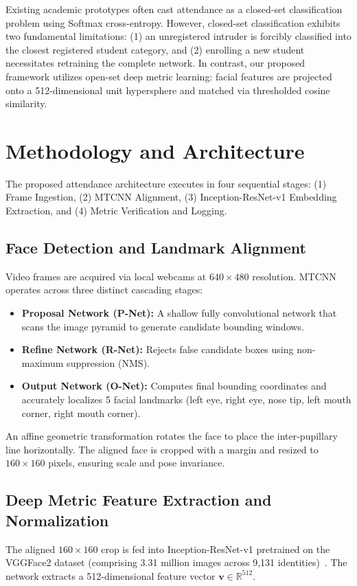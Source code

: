 \documentclass[conference]{IEEEtran}
\begin{document}
Existing academic prototypes often cast attendance as a closed-set classification problem using Softmax cross-entropy. However, closed-set classification exhibits two fundamental limitations: (1) an unregistered intruder is forcibly classified into the closest registered student category, and (2) enrolling a new student necessitates retraining the complete network. In contrast, our proposed framework utilizes open-set deep metric learning: facial features are projected onto a 512-dimensional unit hypersphere and matched via thresholded cosine similarity.

\section{Methodology and Architecture}
The proposed attendance architecture executes in four sequential stages: (1) Frame Ingestion, (2) MTCNN Alignment, (3) Inception-ResNet-v1 Embedding Extraction, and (4) Metric Verification and Logging.

\subsection{Face Detection and Landmark Alignment}
Video frames are acquired via local webcams at $640\times 480$ resolution. MTCNN operates across three distinct cascading stages:
\begin{itemize}
    \item \textbf{Proposal Network (P-Net):} A shallow fully convolutional network that scans the image pyramid to generate candidate bounding windows.
    \item \textbf{Refine Network (R-Net):} Rejects false candidate boxes using non-maximum suppression (NMS).
    \item \textbf{Output Network (O-Net):} Computes final bounding coordinates and accurately localizes 5 facial landmarks (left eye, right eye, nose tip, left mouth corner, right mouth corner).
\end{itemize}

An affine geometric transformation rotates the face to place the inter-pupillary line horizontally. The aligned face is cropped with a margin and resized to $160\times 160$ pixels, ensuring scale and pose invariance.

\subsection{Deep Metric Feature Extraction and Normalization}
The aligned $160\times 160$ crop is fed into Inception-ResNet-v1 pretrained on the VGGFace2 dataset (comprising 3.31 million images across 9,131 identities)~\cite{cao2018vggface2}. The network extracts a 512-dimensional feature vector $\mathbf{v} \in \mathbb{R}^{512}$.
\end{document}
